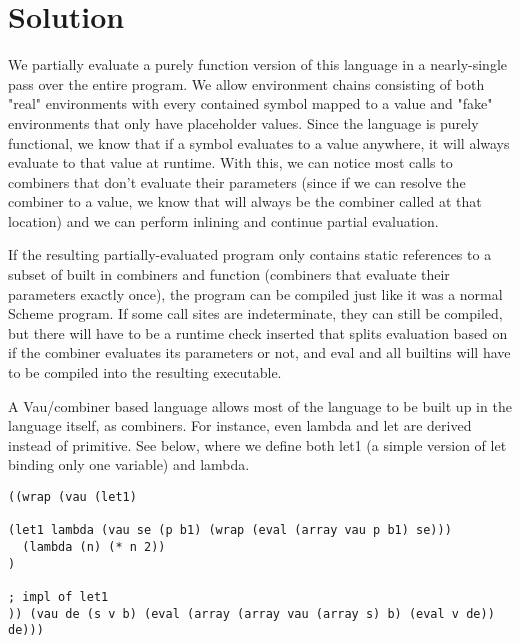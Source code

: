 \documentclass[acmsmall]{acmart}
\begin{document}
\section{Solution}
  We partially evaluate a purely function version of this language in a nearly-single pass over the entire program.
  We allow environment chains consisting of both "real" environments with every contained symbol mapped to a value and "fake" environments
  that only have placeholder values. Since the language is purely functional, we know that if a symbol evaluates to a value anywhere, it
  will always evaluate to that value at runtime. With this, we can notice most calls to combiners that don't evaluate their parameters
  (since if we can resolve the combiner to a value, we know that will always be the combiner called at that location) and we can perform
  inlining and continue partial evaluation.

  If the resulting partially-evaluated program only contains static references to a subset of built in combiners and function (combiners that
  evaluate their parameters exactly once), the program can be compiled just like it was a normal Scheme program.
  If some call sites are indeterminate, they can still be compiled, but there will have to be a runtime check inserted that splits
  evaluation based on if the combiner evaluates its parameters or not, and eval and all builtins will have to be compiled into the resulting executable.

  A Vau/combiner based language allows most of the language to be built up in the language itself, as combiners. For instance, even lambda and let
  are derived instead of primitive. See below, where we define both let1 (a simple version of let binding only one variable) and lambda.
\begin{verbatim}
((wrap (vau (let1)

(let1 lambda (vau se (p b1) (wrap (eval (array vau p b1) se)))
  (lambda (n) (* n 2))
)

; impl of let1
)) (vau de (s v b) (eval (array (array vau (array s) b) (eval v de)) de)))
\end{verbatim}



\end{document}
